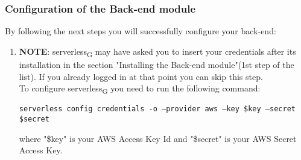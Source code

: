\subsubsection{Configuration of the Back-end module}
By following the next steps you will successfully configure your back-end:
\begin{enumerate}
\item \textbf{NOTE}: serverless\textsubscript{G} may have asked you to insert your credentials after its installation in the section "Installing the Back-end module"(1st step of the list). If you already logged in at that point you can skip this step.\\ 
To configure serverless\textsubscript{G} you need to run the following command:
\begin{center}
\texttt{serverless config credentials -o --provider aws --key \$key --secret \$secret}
\end{center}
where "\$key" is your AWS Access Key Id and "\$secret" is your AWS Secret Access Key.
\end{enumerate}
